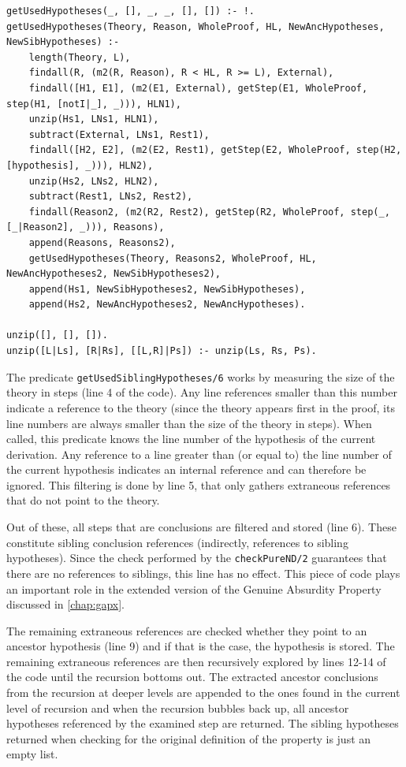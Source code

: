 \documentclass[11pt,twoside,a4paper]{report}
\begin{document}
\begin{lstlisting}[caption={Gathering of referenced ancestor derivations for the original Genuine Absurdity Property definition},label=lst:ancmining]
% Uses the line references to find referenced sibling derivations
getUsedHypotheses(_, [], _, _, [], []) :- !.
getUsedHypotheses(Theory, Reason, WholeProof, HL, NewAncHypotheses, NewSibHypotheses) :-
	length(Theory, L),
	findall(R, (m2(R, Reason), R < HL, R >= L), External),
	findall([H1, E1], (m2(E1, External), getStep(E1, WholeProof, step(H1, [notI|_], _))), HLN1),
	unzip(Hs1, LNs1, HLN1),
	subtract(External, LNs1, Rest1),
	findall([H2, E2], (m2(E2, Rest1), getStep(E2, WholeProof, step(H2, [hypothesis], _))), HLN2),
	unzip(Hs2, LNs2, HLN2),
	subtract(Rest1, LNs2, Rest2),
	findall(Reason2, (m2(R2, Rest2), getStep(R2, WholeProof, step(_, [_|Reason2], _))), Reasons),
	append(Reasons, Reasons2),
	getUsedHypotheses(Theory, Reasons2, WholeProof, HL, NewAncHypotheses2, NewSibHypotheses2),
	append(Hs1, NewSibHypotheses2, NewSibHypotheses),
	append(Hs2, NewAncHypotheses2, NewAncHypotheses).
	
unzip([], [], []).
unzip([L|Ls], [R|Rs], [[L,R]|Ps]) :- unzip(Ls, Rs, Ps).
\end{lstlisting}

The predicate \lstinline$getUsedSiblingHypotheses/6$ works by measuring the size of the theory in steps (line 4 of the code). Any line references smaller than this number indicate a reference to the theory (since the theory appears first in the proof, its line numbers are always smaller than the size of the theory in steps). When called, this predicate knows the line number of the hypothesis of the current derivation. Any reference to a line greater than (or equal to) the line number of the current hypothesis indicates an internal reference and can therefore be ignored. This filtering is done by line 5, that only gathers extraneous references that do not point to the theory. 

Out of these, all steps that are conclusions are filtered and stored (line 6). These constitute sibling conclusion references (indirectly, references to sibling hypotheses). Since the check performed by the \lstinline$checkPureND/2$ guarantees that there are no references to siblings, this line has no effect. This piece of code plays an important role in the extended version of the Genuine Absurdity Property discussed in \autoref{chap:gapx}.

The remaining extraneous references are checked whether they point to an ancestor hypothesis (line 9) and if that is the case, the hypothesis is stored. The remaining extraneous references are then recursively explored by lines 12-14 of the code until the recursion bottoms out. The extracted ancestor conclusions from the recursion at deeper levels are appended to the ones found in the current level of recursion and when the recursion bubbles back up, all ancestor hypotheses referenced by the examined step are returned. The sibling hypotheses returned when checking for the original definition of the property is just an empty list.
\end{document}
